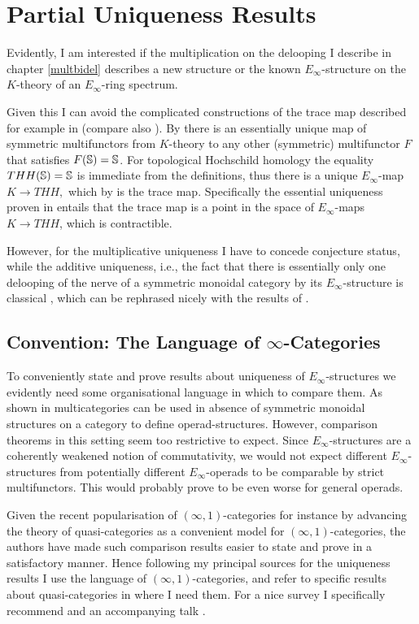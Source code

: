 \chapter{Partial Uniqueness Results} \label{conjun}
Evidently, I am interested if the multiplication on the delooping 
I describe in chapter \ref{multbidel} describes a new structure or the 
known $E_\infty$-structure on the $K$-theory of an $E_\infty$-ring 
spectrum. 

Given this I can avoid the complicated constructions of the 
trace map described for example in \cite{BHMtr, S tr} (compare also 
\cite{DGM12}). By \cite{BGT2013} there is an essentially unique
map of symmetric multifunctors from $K$-theory to any other 
(symmetric) multifunctor $F$ that satisfies $F(\S)=\S$. For
topological Hochschild homology the equality $THH(\S)=\S$ is
immediate from the definitions, thus there is a unique $E_\infty$-map
$K\rightarrow THH,$ which by \cite[Theorem 1.9]{BGT2013} is the trace map.
Specifically the essential uniqueness proven in \cite{BGT2013} entails
that the trace map is a point in the space of $E_\infty$-maps $K\rightarrow THH$,
which is contractible.

However, for the multiplicative uniqueness I have to concede conjecture
status, while the additive uniqueness, i.e., the fact that there is
essentially only one delooping of the nerve of a symmetric monoidal 
category by its $E_\infty$-structure is classical \cite{MT1978}, 
which can be rephrased nicely with the results of \cite{GGN}.

\section*{Convention: The Language of $\infty$-Categories}
To conveniently state and prove results about uniqueness of 
$E_\infty$-structures we evidently need some organisational
language in which to compare them. As shown in \cite{EM} 
multicategories can be used in absence of 
symmetric monoidal structures on a category to define
operad-structures. However, comparison theorems in this setting seem 
too restrictive to expect. Since $E_\infty$-structures
are a coherently weakened notion of commutativity, we would
not expect different $E_\infty$-structures from potentially
different $E_\infty$-operads to be comparable by strict 
multifunctors. This would probably prove to be even worse for
general operads. 

Given the recent popularisation of $(\infty,1)$-categories for instance
by \cite{Bergn1, Bergn2, Joyal,JoyT,Lu1,Lu2} 
advancing the theory of quasi-categories as a convenient model for 
$(\infty,1)$-categories, the authors have made such comparison results easier
to state and prove in a satisfactory manner. Hence following my
principal sources \cite{GGN,BGT2013} for the uniqueness results
I use the language of $(\infty,1)$-categories, and refer to 
specific results about quasi-categories in \cite{Lu1, Lu2} where 
I need them. 
For a nice survey I specifically recommend \cite{Bergn2} and 
an accompanying talk \cite{Bergn3}.

